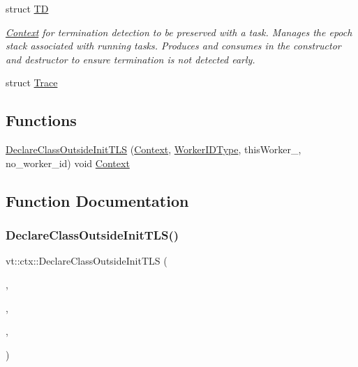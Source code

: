 \begin{DoxyCompactItemize}
struct \hyperlink{structvt_1_1ctx_1_1_t_d}{TD}
\begin{DoxyCompactList}\small\item\em \hyperlink{structvt_1_1ctx_1_1_context}{Context} for termination detection to be preserved with a task. Manages the epoch stack associated with running tasks. Produces and consumes in the constructor and destructor to ensure termination is not detected early. \end{DoxyCompactList}\item 
struct \hyperlink{structvt_1_1ctx_1_1_trace}{Trace}
\end{DoxyCompactItemize}
\subsection*{Functions}
\begin{DoxyCompactItemize}
\item 
\hyperlink{namespacevt_1_1ctx_a2b0a82bed85b7c9b0e1c72829319118a}{Declare\+Class\+Outside\+Init\+T\+LS} (\hyperlink{structvt_1_1ctx_1_1_context}{Context}, \hyperlink{namespacevt_a656e362091da17b9b93d0655b36e3392}{Worker\+I\+D\+Type}, this\+Worker\+\_\+, no\+\_\+worker\+\_\+id) void \hyperlink{structvt_1_1ctx_1_1_context}{Context}
\end{DoxyCompactItemize}


\subsection{Function Documentation}
\mbox{\label{namespacevt_1_1ctx_a2b0a82bed85b7c9b0e1c72829319118a}} 
\subsubsection{\texorpdfstring{Declare\+Class\+Outside\+Init\+T\+L\+S()}{DeclareClassOutsideInitTLS()}}
{\footnotesize\ttfamily vt\+::ctx\+::\+Declare\+Class\+Outside\+Init\+T\+LS (\begin{DoxyParamCaption}\item[{\hyperlink{structvt_1_1ctx_1_1_context}{Context}}]{,  }\item[{\hyperlink{namespacevt_a656e362091da17b9b93d0655b36e3392}{Worker\+I\+D\+Type}}]{,  }\item[{this\+Worker\+\_\+}]{,  }\item[{no\+\_\+worker\+\_\+id}]{ }\end{DoxyParamCaption})}

